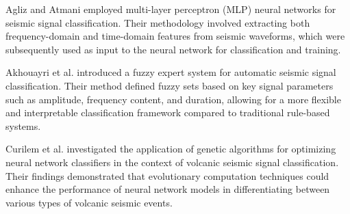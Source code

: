 \documentclass[conference]{IEEEtran}
\begin{document}
Agliz and Atmani \cite{b8} employed
multi-layer perceptron (MLP) neural networks for seismic signal classification.
Their methodology involved extracting both frequency-domain and time-domain
features from seismic waveforms, which were subsequently used as input to the
neural network for classification and training.


Akhouayri et al. \cite{b9}
introduced a fuzzy expert system for automatic seismic signal classification.
Their method defined fuzzy sets based on key signal parameters such as
amplitude, frequency content, and duration, allowing for a more flexible and
interpretable classification framework compared to traditional rule-based
systems.


Curilem et al. \cite{b10} investigated the application of genetic
algorithms for optimizing neural network classifiers in the context of volcanic
seismic signal classification. Their findings demonstrated that evolutionary
computation techniques could enhance the performance of neural network models in
differentiating between various types of volcanic seismic events.
\end{document}
